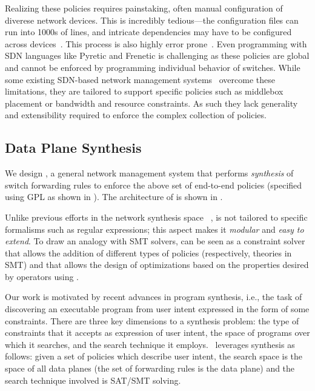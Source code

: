 \noindent Realizing these policies requires painstaking, often
manual configuration of diverese network devices. This is incredibly
tedious---the configuration files can run into 1000s of lines, and
intricate dependencies may have to be configured across
devices~\cite{benson:complexity:nsdi2009,mpa-imc15}. This process is
also highly error prone~\cite{mpa-imc15}. Even programming with SDN
languages like Pyretic and Frenetic is challenging as these policies
are global and cannot be enforced by programming individual behavior
of switches.  While some existing SDN-based network management
systems~\cite{simple,merlin,oneswitch} overcome these limitations,
they are tailored to support specific policies such as middlebox
placement or bandwidth and resource constraints. As such they lack
generality and extensibility required to enforce the complex
collection of policies.


\subsection{Data Plane Synthesis} \label{sec:synthesis} 


We design \name, a general network management system that 
 performs {\em synthesis} of switch forwarding
rules to enforce the above set of end-to-end policies (specified using 
GPL as shown in ). The architecture of \name
is shown in .

Unlike previous efforts in the network synthesis space ~\cite{netgen,merlin}, \Name is
not tailored to specific formalisms such as regular expressions; 
this aspect makes it {\em modular} and {\em easy to extend}.
To draw an analogy with SMT solvers, \Name can be seen as a constraint
solver that allows the addition of different types of policies
(respectively, theories in SMT) and that allows the design of
optimizations based on the properties desired by 
  operators using \Name. 
  
  Our work is motivated by recent advances in program synthesis, i.e.,
  the task of discovering an executable program from user intent
  expressed in the form of some constraints. There are three key
  dimensions to a synthesis problem: the type of constraints that it accepts as
  expression of user intent, the space of programs over which it
  searches, and the search technique it employs. 
\Name\ leverages synthesis as follows: given a set of
policies which describe user intent, the search space is the space of
all data planes (the set of forwarding rules is the data plane) 
and the search technique involved
is SAT/SMT solving. 

